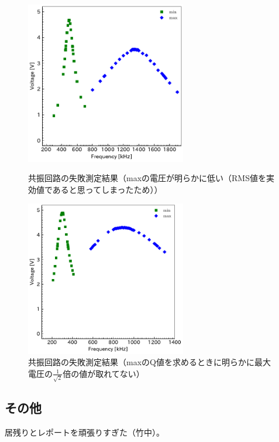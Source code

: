 \documentclass[report.tex]{subfiles}
\begin{document}
\begin{figure}[H]
	\begin{minipage}[b]{0.5\linewidth}
		\centering
		\includegraphics[width=7cm]{fig/min_max.pdf}
		\caption{共振回路の失敗測定結果（maxの電圧が明らかに低い（RMS値を実効値であると思ってしまったため））}
		\label{fig:100}
	\end{minipage}
	\begin{minipage}[b]{0.5\linewidth}
		\centering
		\includegraphics[width=7cm]{fig/min_max2.pdf}
		\caption{共振回路の失敗測定結果（maxのQ値を求めるときに明らかに最大電圧の\(\frac{1}{\sqrt{2}}\)倍の値が取れてない）}
		\label{fig:000}
	\end{minipage}
\end{figure}

\subsection{その他}

居残りとレポートを頑張りすぎた（竹中）。
\end{document}
